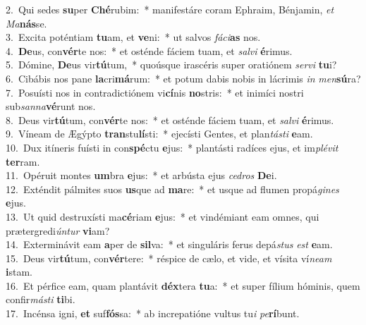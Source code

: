 {2.~}Qui sedes \textbf{su}per \textbf{Ché}rubim:~* manifestáre coram Ephraim, Bénjamin, \textit{et} \textit{Ma}\textbf{nás}se.\\
{3.~}Excita poténtiam \textbf{tu}am, et \textbf{ve}ni:~* ut salvos \textit{fá}\textit{ci}\textbf{as} nos.\\
{4.~}\textbf{De}us, con\textbf{vér}te nos:~* et osténde fáciem tuam, et \textit{sal}\textit{vi} \textbf{é}rimus.\\
{5.~}Dómine, \textbf{De}us vir\textbf{tú}tum,~* quoúsque irascéris super oratiónem \textit{ser}\textit{vi} \textbf{tu}i?\\
{6.~}Cibábis nos pane \textbf{la}cri\textbf{má}rum:~* et potum dabis nobis in lácrimis \textit{in} \textit{men}\textbf{sú}ra?\\
{7.~}Posuísti nos in contradictiónem vi\textbf{cí}nis \textbf{no}stris:~* et inimíci nostri sub\textit{san}\textit{na}\textbf{vé}runt nos.\\
{8.~}Deus vir\textbf{tú}tum, con\textbf{vér}te nos:~* et osténde fáciem tuam, et \textit{sal}\textit{vi} \textbf{é}rimus.\\
{9.~}Víneam de Ægýpto \textbf{tran}stu\textbf{lí}sti:~* ejecísti Gentes, et plan\textit{tá}\textit{sti} \textbf{e}am.\\
{10.~}Dux itíneris fuísti in con\textbf{spé}ctu \textbf{e}jus:~* plantásti radíces ejus, et im\textit{plé}\textit{vit} \textbf{ter}ram.\\
{11.~}Opéruit montes \textbf{um}bra \textbf{e}jus:~* et arbústa ejus \textit{ce}\textit{dros} \textbf{De}i.\\
{12.~}Exténdit pálmites suos \textbf{us}que ad \textbf{ma}re:~* et usque ad flumen propá\textit{gi}\textit{nes} \textbf{e}jus.\\
{13.~}Ut quid destruxísti ma\textbf{cé}riam \textbf{e}jus:~* et vindémiant eam omnes, qui prætergredi\textit{ún}\textit{tur} \textbf{vi}am?\\
{14.~}Exterminávit eam \textbf{a}per de \textbf{sil}va:~* et singuláris ferus depá\textit{stus} \textit{est} \textbf{e}am.\\
{15.~}Deus vir\textbf{tú}tum, con\textbf{vér}tere:~* réspice de cælo, et vide, et vísita ví\textit{ne}\textit{am} \textbf{i}stam.\\
{16.~}Et pérfice eam, quam plantávit \textbf{déx}tera \textbf{tu}a:~* et super fílium hóminis, quem confir\textit{má}\textit{sti} \textbf{ti}bi.\\
{17.~}Incénsa igni, \textbf{et} suf\textbf{fós}sa:~* ab increpatióne vultus tu\textit{i} \textit{pe}\textbf{rí}bunt.\\
